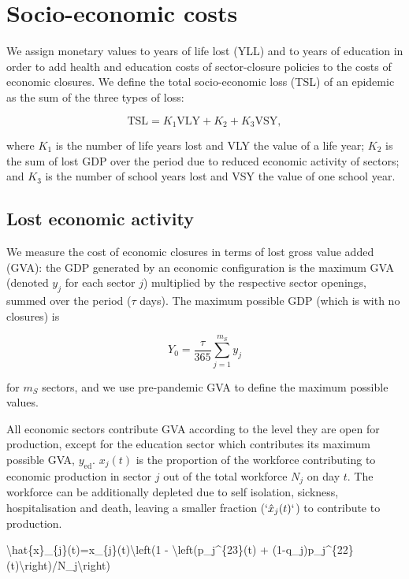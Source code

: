 \documentclass[
]{article}
\newenvironment{Shaded}{\begin{snugshade}}{\end{snugshade}}
\newcommand{\NormalTok}[1]{#1}
\begin{document}
\section{Socio-economic costs}\label{socio-economic-costs}

We assign monetary values to years of life lost (YLL) and to years of education in order to add health and education costs of sector-closure policies to the costs of economic closures. We define the total socio-economic loss (TSL) of an epidemic as the sum of the three types of loss:

\begin{equation}
\text{TSL} = K_1\text{VLY} + K_2 + K_3\text{VSY},
\label{eq:swf}
\end{equation}

where \(K_1\) is the number of life years lost and VLY the value of a life year; \(K_2\) is the sum of lost GDP over the period due to reduced economic activity of sectors; and \(K_3\) is the number of school years lost and VSY the value of one school year.

\subsection{Lost economic activity}\label{lost-economic-activity}

We measure the cost of economic closures in terms of lost gross value added (GVA): the GDP generated by an economic configuration is the maximum GVA (denoted \(y_j\) for each sector \(j\)) multiplied by the respective sector openings, summed over the period (\(\tau\) days). The maximum possible GDP (which is with no closures) is

\[Y_0=\frac{\tau}{365}\sum_{j=1}^{m_S}y_j\]

for \(m_S\) sectors, and we use pre-pandemic GVA to define the maximum possible values.

All economic sectors contribute GVA according to the level they are open for production, except for the education sector which contributes its maximum possible GVA, \(y_{\text{ed}}\). \(x_{j}(t)\) is the proportion of the workforce contributing to economic production in sector \(j\) out of the total workforce \(N_j\) on day \(t\). The workforce can be additionally depleted due to self isolation, sickness, hospitalisation and death, leaving a smaller fraction (\(`\hat{x}_{j}(t)`\)) to contribute to production.

\begin{Shaded}
\begin{Highlighting}[]
\NormalTok{\textbackslash{}hat\{x\}\_\{j\}(t)=x\_\{j\}(t)\textbackslash{}left(1 {-} \textbackslash{}left(p\_j\^{}\{23\}(t)  + (1{-}q\_j)p\_j\^{}\{22\}(t)\textbackslash{}right)/N\_j\textbackslash{}right)}
\end{Highlighting}
\end{Shaded}
\end{document}
